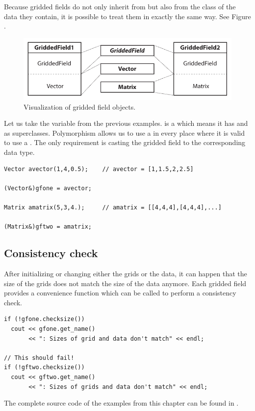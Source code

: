 Because gridded fields do not only inherit from  but
also from the class of the data they contain, it is possible to treat them in
exactly the same way. See Figure .

\begin{figure}[ht!]
\begin{center}
\includegraphics{Figs/development/griddedfields_objects}
\caption{Visualization of gridded field objects.}
\end{center}
\end{figure}

Let us take the  variable from the previous examples.
 is a  which means it has
 and  as superclasses. Polymorphism
allows us to use a  in every place where it is valid
to use a . The only requirement is casting the gridded field
to the corresponding data type.

\begin{verbatim}
Vector avector(1,4,0.5);    // avector = [1,1.5,2,2.5]

(Vector&)gfone = avector;

Matrix amatrix(5,3,4.);     // amatrix = [[4,4,4],[4,4,4],...]

(Matrix&)gftwo = amatrix;
\end{verbatim}

\subsection{Consistency check}

After initializing or changing either the grids or the data, it can happen
that the size of the grids does not match the size of the data anymore. Each
gridded field provides a convenience function which can be called to perform a
consistency check.

\begin{verbatim}
if (!gfone.checksize())
  cout << gfone.get_name()
       << ": Sizes of grid and data don't match" << endl;

// This should fail!
if (!gftwo.checksize())
  cout << gftwo.get_name()
       << ": Sizes of grids and data don't match" << endl;
\end{verbatim}

The complete source code of the examples from this chapter can be found in
.


